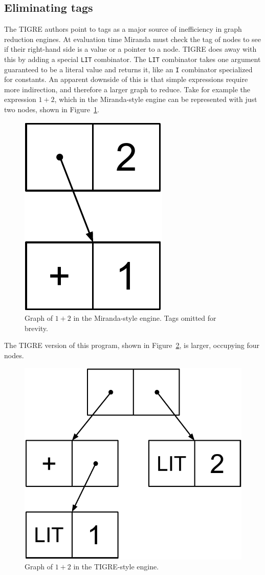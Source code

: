 \documentclass[conference]{IEEEtran}
\begin{document}
\subsection{Eliminating tags}
The TIGRE authors point to tags as a major source of inefficiency in graph reduction engines.
At evaluation time Miranda must check the tag of nodes to see if their right-hand side is a value or a pointer to a node.
TIGRE does away with this by adding a special \texttt{LIT} combinator.
The \texttt{LIT} combinator takes one argument guaranteed to be a literal value and returns it, like an \texttt{I} combinator specialized for constants.
An apparent downside of this is that simple expressions require more indirection, and therefore a larger graph to reduce.
Take for example the expression $1+2$, which in the Miranda-style engine can be represented with just two nodes, shown in Figure~\ref{fig:1_plus_2_miranda}.

\begin{figure}
    \includegraphics[width=.17\columnwidth]{1_plus_2_miranda}
    \centering
    \caption{
        Graph of $1 + 2$ in the Miranda-style engine.
        Tags omitted for brevity.
    }
    \label{fig:1_plus_2_miranda}
\end{figure}

The TIGRE version of this program, shown in Figure~\ref{fig:1_plus_2_tigre}, is larger, occupying four nodes.

\begin{figure}
    \includegraphics[width=.38\columnwidth]{1_plus_2_tigre}
    \centering
    \caption{
        Graph of $1 + 2$ in the TIGRE-style engine.
    }
    \label{fig:1_plus_2_tigre}
\end{figure}
\end{document}

